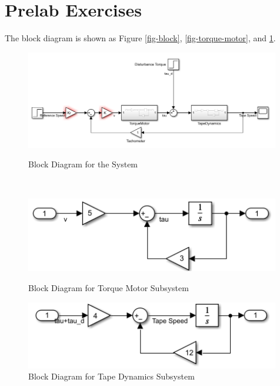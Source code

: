 
\def\LABNUMBER{3}
\def\LABTITLE{Digital Simulation of a Closed-Loop System}
\def\RPTDATE{\today}
\def\EXPDATE{October 25, 2022}



    \makeMyTitle
   
    \section*{\sc Prelab Exercises}
    The block diagram is shown as Figure \ref{fig-block}, \ref{fig-torque-motor}, and \ref{fig-tape-dynamics}.

    \begin{figure}[h!]
        \begin{minipage}{0.99\linewidth}
            \centering
            \includegraphics[width=0.99\textwidth]{figs/prelab-block-overall.png}
            \caption{Block Diagram for the System}
            \label{fig-block}
        \end{minipage}
        \\
        \begin{minipage}{0.48\linewidth}
            \centering
            \includegraphics[width=0.99\textwidth]{figs/prelab-block-torque-motor.png}
            \caption{Block Diagram for Torque Motor Subsystem}
            \label{fig-torque-motor}
        \end{minipage}
        \hspace{2em}
        \begin{minipage}{0.48\linewidth}
            \centering
            \includegraphics[width=0.99\textwidth]{figs/prelab-block-tape-dynamics.png}
            \caption{Block Diagram for Tape Dynamics Subsystem}
            \label{fig-tape-dynamics}
        \end{minipage}
    \end{figure}

